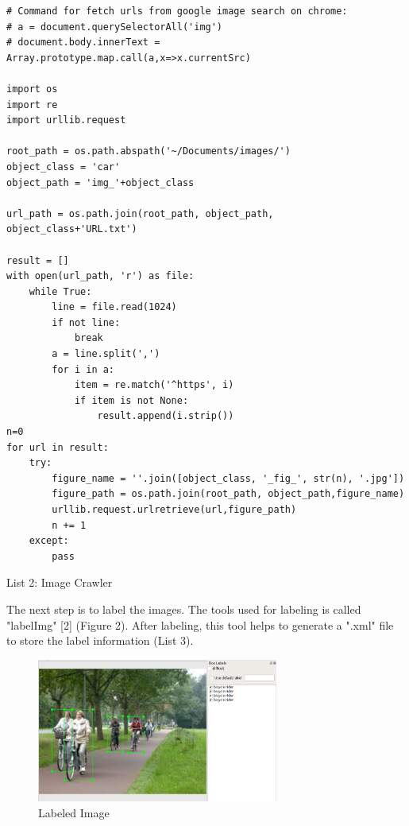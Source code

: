 \documentclass[titlepage]{article}
\begin{document}
\begin{listing}
\begin{verbatim}
# Command for fetch urls from google image search on chrome:
# a = document.querySelectorAll('img')
# document.body.innerText = Array.prototype.map.call(a,x=>x.currentSrc)

import os
import re
import urllib.request

root_path = os.path.abspath('~/Documents/images/')
object_class = 'car'
object_path = 'img_'+object_class

url_path = os.path.join(root_path, object_path, object_class+'URL.txt')

result = []
with open(url_path, 'r') as file:
    while True:
        line = file.read(1024)
        if not line:
            break
        a = line.split(',')
        for i in a:
            item = re.match('^https', i)
            if item is not None:
                result.append(i.strip())
n=0
for url in result:
    try:
        figure_name = ''.join([object_class, '_fig_', str(n), '.jpg'])
        figure_path = os.path.join(root_path, object_path,figure_name)
        urllib.request.urlretrieve(url,figure_path)
        n += 1
    except:
        pass
\end{verbatim}
\centering
\caption{List 2: Image Crawler}
\newline
\end{listing}

The next step is to label the images. The tools used for labeling is called
"labelImg" [2] (Figure 2). After labeling, this tool helps to generate a ".xml"
file to store the label information (List 3).

\begin{figure}[htbp]
\centering
\includegraphics[width=300]{img_labeling.png}
\caption{Labeled Image}
\end{figure}
\end{document}
